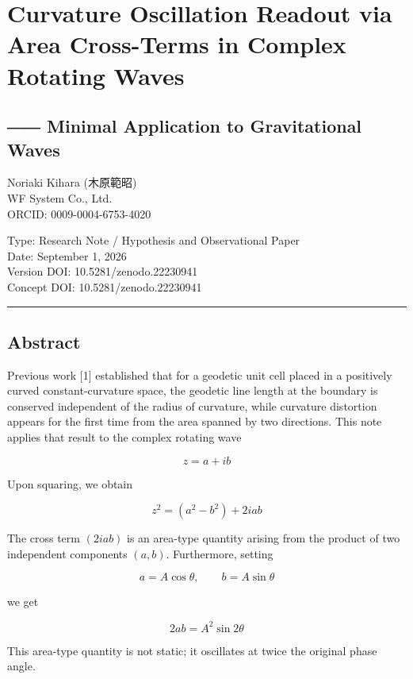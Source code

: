 \documentclass[
  a4paper,
]{article}
\author{}
\date{}
\begin{document}
\section{Curvature Oscillation Readout via Area Cross-Terms in Complex
Rotating
Waves}\label{curvature-oscillation-readout-via-area-cross-terms-in-complex-rotating-waves}

\subsection{―― Minimal Application to Gravitational
Waves}\label{minimal-application-to-gravitational-waves}

Noriaki Kihara (木原範昭)\\
WF System Co., Ltd.\\
ORCID: 0009-0004-6753-4020

Type: Research Note / Hypothesis and Observational Paper\\
Date: September 1, 2026\\
Version DOI: 10.5281/zenodo.22230941\\
Concept DOI: 10.5281/zenodo.22230941

\begin{center}\rule{0.5\linewidth}{0.5pt}\end{center}

\subsection{Abstract}\label{abstract}

Previous work {[}1{]} established that for a geodetic unit cell placed
in a positively curved constant-curvature space, the geodetic line
length at the boundary is conserved independent of the radius of
curvature, while curvature distortion appears for the first time from
the area spanned by two directions. This note applies that result to the
complex rotating wave

\[z=a+ib\]

Upon squaring, we obtain

\[z^2=(a^2-b^2)+2iab\]

The cross term \((2iab)\) is an area-type quantity arising from the
product of two independent components \((a,b)\). Furthermore, setting

\[a=A\cos\theta,\qquad b=A\sin\theta\]

we get

\[2ab=A^2\sin 2\theta\]

This area-type quantity is not static; it oscillates at twice the
original phase angle.
\end{document}
